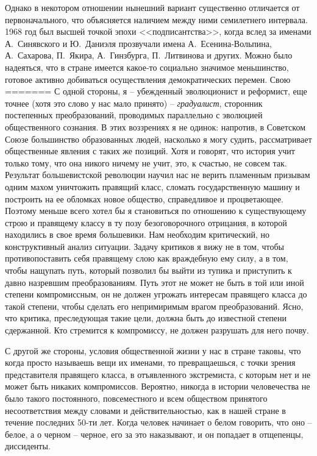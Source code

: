 \documentclass{book}
\begin{document}
Однако в некотором отношении нынешний вариант существенно отличается от первоначального, что объясняется наличием между ними 
семилетнего интервала. 1968 год был высшей точкой эпохи <<подписантства>>, когда вслед за именами А.~Синявского и Ю.~Даниэля 
прозвучали имена А.~Есенина‑Вольпина, А.~Сахарова, П.~Якира, А.~Гинзбурга, П.~Литвинова и других. Можно было надеяться, что в 
стране имеется какое‑то социально значимое меньшинство, готовое активно добиваться осуществления демократических перемен. Свою 
=======
С одной стороны, я -- убежденный эволюционист и реформист, еще точнее (хотя это слово у нас мало принято) -- 
\textit{градуалист},  сторонник постепенных преобразований, проводимых параллельно с эволюцией общественного сознания. В этих 
воззрениях я не одинок: напротив, в Советском Союзе большинство образованных людей, насколько я могу судить, рассматривает 
общественные явления с таких же позиций. Хотя и говорят, что история учит только тому, что она никого ничему не учит, это, к 
счастью, не совсем так. Результат большевистской революции научил нас не верить пламенным призывам одним махом уничтожить 
правящий класс, сломать государственную машину и построить на ее обломках новое общество, справедливое и процветающее. Поэтому 
меньше всего хотел бы я становиться по отношению к существующему строю и правящему классу в ту позу безоговорочного отрицания, в 
которой находились в свое время большевики. Нам необходим критический, но конструктивный анализ ситуации. Задачу критиков я вижу 
не в том, чтобы противопоставить себя правящему слою как враждебную ему силу, а в том, чтобы нащупать путь, который позволил бы 
выйти из тупика и приступить к давно назревшим преобразованиям. Путь этот не может не быть в той или иной степени компромиссным, 
он не должен угрожать интересам правящего класса до такой степени, чтобы сделать его непримиримым врагом преобразований. Ясно, 
что критика, преследующая такие цели, должна быть до известной степени сдержанной. Кто стремится к компромиссу, не должен 
разрушать для него почву.

С другой же стороны, условия общественной жизни у нас в стране таковы, что когда просто называешь вещи их именами, то 
превращаешься, с точки зрения представителя правящего класса, в отъявленного экстремиста, с которым нет и не может быть никаких 
компромиссов. Вероятно, никогда в истории человечества не было такого постоянного, повсеместного и всем обществом принятого 
несоответствия между словами и действительностью, как в нашей стране в течение последних 50-ти лет. Когда человек начинает о 
белом говорить, что оно -- белое, а о черном -- черное, его за это наказывают, и он попадает в отщепенцы, диссиденты.
\end{document}
